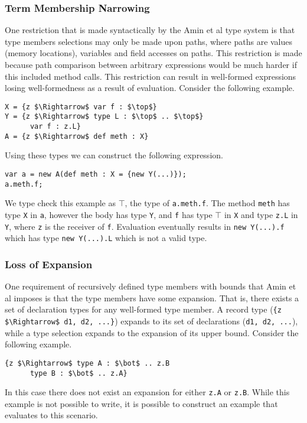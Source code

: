\documentclass[11pt
              , a4paper
              , twoside
              , openright
              ]{report}
\numberwithin{case}{theorem}
\numberwithin{subcase}{case}
\begin{document}
\subsubsection{Term Membership Narrowing}
One restriction that is made syntactically by the Amin et al \cite{amin:fool:2012} type system is that type members selections may only be made upon paths, where paths are values (memory locations), variables and field accesses on paths. This restriction is made because path comparison between arbitrary expressions would be much harder if this included method calls. This restriction can result in well-formed expressions losing well-formedness as a result of evaluation. Consider the following example.
\begin{lstlisting}[mathescape, style=custom_lang]
X = {z $\Rightarrow$ var f : $\top$}
Y = {z $\Rightarrow$ type L : $\top$ .. $\top$}
	  var f : z.L}
A = {z $\Rightarrow$ def meth : X}
\end{lstlisting}
Using these types we can construct the following expression.
\begin{lstlisting}[mathescape, style=custom_lang]
var a = new A(def meth : X = {new Y(...)});
a.meth.f;
\end{lstlisting}
We type check this example as $\top$, the type of \verb|a.meth.f|. The method \verb|meth| has type \verb|X| in \verb|a|, however the body has type \verb|Y|, and \verb|f| has type $\top$ in \verb|X| and type \verb|z.L| in \verb|Y|, where \verb|z| is the receiver of \verb|f|. Evaluation eventually results in \verb|new Y(...).f| which has type \verb|new Y(...).L| which is not a valid type. 

\subsubsection{Loss of Expansion}
One requirement of recursively defined type members with bounds that Amin et al imposes is that the type members have some expansion. That is, there exists a set of declaration types for any well-formed type member. A record type (\verb|{z $\Rightarrow$ d1, d2, ...}|) expands to its set of declarations (\verb|d1, d2, ...|), while a type selection expands to the expansion of its upper bound. Consider the following example.
\begin{lstlisting}[mathescape, style=custom_lang]
{z $\Rightarrow$ type A : $\bot$ .. z.B
      type B : $\bot$ .. z.A}
\end{lstlisting}
In this case there does not exist an expansion for either \verb|z.A| or \verb|z.B|. While this example is not possible to write, it is possible to construct an example that evaluates to this scenario.
\end{document}
